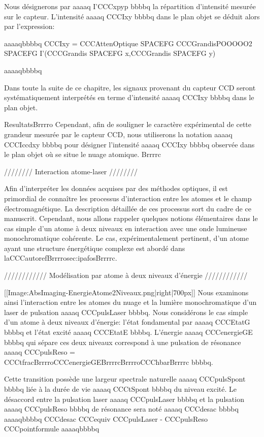 Nous désignerons par aaaaq I'CCCxpyp bbbbq la répartition d'intensité mesurée sur le capteur. L'intensité aaaaq CCCIxy bbbbq dans le plan objet se déduit alors par l'expression:


aaaaqbbbbq
	CCCIxy = CCCAttenOptique  SPACEFG  CCCGrandisPOOOOO2  SPACEFG  I'(CCCGrandis SPACEFG x,CCCGrandis SPACEFG y)
	
aaaaqbbbbq



Dans toute la suite de ce chapitre, les signaux provenant du capteur CCD seront systématiquement interprétés en terme d'intensité aaaaq CCCIxy bbbbq dans le plan objet.




ResultatsBrrrro
Cependant, afin de souligner le caractère expérimental de cette grandeur mesurée par le capteur CCD, nous utiliserons la notation aaaaq CCCIccdxy bbbbq pour désigner l'intensité aaaaq CCCIxy bbbbq observée dans le plan objet où se situe le nuage atomique.
Brrrrc


//////// Interaction atome-laser ////////

Afin d'interpréter les données acquises par des méthodes optiques, il est primordial de connaître les processus d'interaction entre les atomes et le champ électromagnétique.
La description détaillée de ces processus sort du cadre de ce manuscrit. Cependant, nous allons rappeler quelques notions élémentaires dans le cas simple d'un atome à deux niveaux en interaction avec une onde lumineuse monochromatique cohérente.
Le cas, expérimentalement pertinent, d'un atome ayant une structure énergétique complexe est abordé dans laCCCautorefBrrrrosec:ipafosBrrrrc.



//////////// Modélisation par atome à deux niveaux d'énergie ////////////

[[Image:AbsImaging-EnergieAtome2Niveaux.png|right|700px]]
Nous examinons ainsi l'interaction entre les atomes du nuage et la lumière monochromatique d'un laser de pulsation aaaaq CCCpulsLaser bbbbq. Nous considérons le cas simple d'un atome à deux niveaux d'énergie: l'état fondamental par aaaaq CCCEtatG bbbbq et l'état excité aaaaq CCCEtatE bbbbq. L'énergie aaaaq CCCenergieGE bbbbq qui sépare ces deux niveaux correspond à une pulsation de résonance
aaaaq CCCpulsReso = CCCtfracBrrrroCCCenergieGEBrrrrcBrrrroCCChbarBrrrrc
 bbbbq.


Cette transition possède une largeur spectrale naturelle aaaaq CCCpulsSpont bbbbq liée à la durée de vie aaaaq CCCtSpont bbbbq du niveau excité. Le désaccord entre la pulsation laser aaaaq CCCpulsLaser bbbbq et la pulsation aaaaq CCCpulsReso bbbbq de résonance sera noté aaaaq CCCdesac bbbbq aaaaqbbbbq
CCCdesac CCCequiv CCCpulsLaser - CCCpulsReso
CCCpointformule
aaaaqbbbbq




